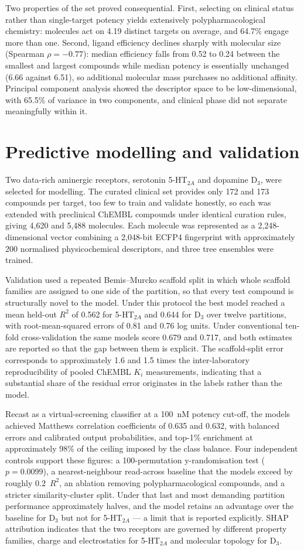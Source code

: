 \documentclass[11pt,a4paper]{article}
\begin{document}
Two properties of the set proved consequential. First, selecting on clinical status rather
than single-target potency yields extensively polypharmacological chemistry: molecules act
on 4.19 distinct targets on average, and 64.7\% engage more than one. Second, ligand
efficiency declines sharply with molecular size (Spearman $\rho=-0.77$): median efficiency
falls from 0.52 to 0.24 between the smallest and largest compounds while median potency is
essentially unchanged (6.66 against 6.51), so additional molecular mass purchases no
additional affinity. Principal component analysis showed the descriptor space to be
low-dimensional, with 65.5\% of variance in two components, and clinical phase did not
separate meaningfully within it.

\section{Predictive modelling and validation}
Two data-rich aminergic receptors, serotonin 5-HT$_{2A}$ and dopamine D$_3$, were selected
for modelling. The curated clinical set provides only 172 and 173 compounds per target, too
few to train and validate honestly, so each was extended with preclinical ChEMBL compounds
under identical curation rules, giving 4,620 and 5,488 molecules. Each molecule was
represented as a 2,248-dimensional vector combining a 2,048-bit ECFP4 fingerprint with
approximately 200 normalised physicochemical descriptors, and three tree ensembles were
trained.

Validation used a repeated Bemis--Murcko scaffold split in which whole scaffold families
are assigned to one side of the partition, so that every test compound is structurally
novel to the model. Under this protocol the best model reached a mean held-out $R^2$ of
0.562 for 5-HT$_{2A}$ and 0.644 for D$_3$ over twelve partitions, with root-mean-squared
errors of 0.81 and 0.76 log units. Under conventional ten-fold cross-validation the same
models score 0.679 and 0.717, and both estimates are reported so that the gap between them
is explicit. The scaffold-split error corresponds to approximately 1.6 and 1.5 times the
inter-laboratory reproducibility of pooled ChEMBL $K_i$ measurements, indicating that a
substantial share of the residual error originates in the labels rather than the model.

Recast as a virtual-screening classifier at a 100~nM potency cut-off, the models achieved
Matthews correlation coefficients of 0.635 and 0.632, with balanced errors and calibrated
output probabilities, and top-1\% enrichment at approximately 98\% of the ceiling imposed
by the class balance. Four independent controls support these figures: a 100-permutation
y-randomisation test ($p=0.0099$), a nearest-neighbour read-across baseline that the models
exceed by roughly 0.2~$R^2$, an ablation removing polypharmacological compounds, and a
stricter similarity-cluster split. Under that last and most demanding partition performance
approximately halves, and the model retains an advantage over the baseline for D$_3$ but
not for 5-HT$_{2A}$ --- a limit that is reported explicitly. SHAP attribution indicates
that the two receptors are governed by different property families, charge and
electrostatics for 5-HT$_{2A}$ and molecular topology for D$_3$.
\end{document}
